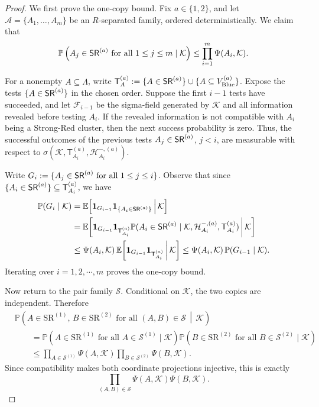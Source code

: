 \documentclass[letterpaper,11pt,reqno]{amsart}
\theoremstyle{definition}
\newcommand{\SR}{{\sf SR}}
\begin{document}
\begin{proof}
We first prove the one-copy bound. Fix \(a\in\{1,2\}\), and let
\(\mathcal A=\{A_1,\ldots,A_m\}\) be an \(R\)-separated family, ordered
deterministically.  We claim that
\[
\mathbb P
\left(
A_j\in\SR^{(a)}\text{ for all }1\le j\le m
\mid
\mathcal K
\right)
\le
\prod_{i=1}^m \Psi (A_i,\mathcal K).
\]

For a nonempty \(A\subseteq\Lambda\), write $\mathsf T_A^{(a)}:=\{A\in\SR^{(a)}\}\cup \{A\subseteq V_{\mathrm{Blue}}^{(a)}\}$. 
Expose the tests $\{A\in\SR^{(a)}\}$ in the chosen order.  Suppose the first \(i-1\) tests have
succeeded, and let \(\mathscr F_{i-1}\) be the sigma-field generated by
\(\mathcal K\) and all information revealed before testing \(A_i\).  If the revealed information is
not compatible with \(A_i\) being a Strong-Red cluster, then the next success probability is zero. 
Thus, the successful outcomes of the previous tests
\(A_j\in\SR^{(a)}\), \(j<i\), are measurable with respect to
$\sigma(\mathcal K,\mathsf T_{A_i}^{(a)},\mathcal H_{A_i}^{-,(a)})$. 

Write $G_i:=\{A_j\in\SR^{(a)}\text{ for all }1\leq j\leq i\}$.
Observe that since \(\{A_i\in\SR^{(a)}\}\subseteq \mathsf T_{A_i}^{(a)}\), we have
\[
\begin{aligned}
\mathbb P(G_i\mid \mathcal K)
&=
\mathbb E\!\left[
\mathbf 1_{G_{i-1}}\mathbf 1_{\{A_i\in\SR^{(a)}\}}
\,\middle|\,
\mathcal K
\right] \\
&=
\mathbb E\!\left[
\mathbf 1_{G_{i-1}}\mathbf 1_{\mathsf T_{A_i}^{(a)}}
\mathbb P(A_i\in\SR^{(a)}\mid\mathcal K,\mathcal H_{A_i}^{-,(a)},\mathsf T_{A_i}^{(a)})
\,\middle|\,
\mathcal K
\right] \\
&\le
\Psi (A_i,\mathcal K)\,
\mathbb E\!\left[
\mathbf 1_{G_{i-1}}\mathbf 1_{\mathsf T_{A_i}^{(a)}}
\,\middle|\,
\mathcal K
\right]
\le
\Psi (A_i,\mathcal K)\,
\mathbb P(G_{i-1}\mid\mathcal K).
\end{aligned}
\]
Iterating over $i=1,2,\cdots,m$ proves the one-copy bound.

Now return to the pair family \(\mathcal S\).  Conditional on \(\mathcal K\),
the two copies are independent.  Therefore
\[
\begin{aligned}
&\mathbb P\left(
A\in\mathrm{SR}^{(1)},\,
B\in\mathrm{SR}^{(2)}
\text{ for all }(A,B)\in\mathcal S
\,\middle|\,
\mathcal K
\right)\\
&\qquad =
\mathbb P
\left(A\in\mathrm{SR}^{(1)}\text{ for all }A\in\mathcal S^{(1)}\mid
\mathcal K \right)
\mathbb P
\left(B\in\mathrm{SR}^{(2)}\text{ for all }B\in\mathcal S^{(2)}\mid\mathcal K\right)\\
&\qquad\le
\prod_{A\in\mathcal S^{(1)}}\Psi (A,\mathcal K)
\prod_{B\in\mathcal S^{(2)}}\Psi (B,\mathcal K).
\end{aligned}
\]
Since compatibility makes both coordinate projections injective, this is exactly
\[
\prod_{(A,B)\in\mathcal S}\Psi (A,\mathcal K)\Psi (B,\mathcal K).
\]
\end{proof}
\end{document}
